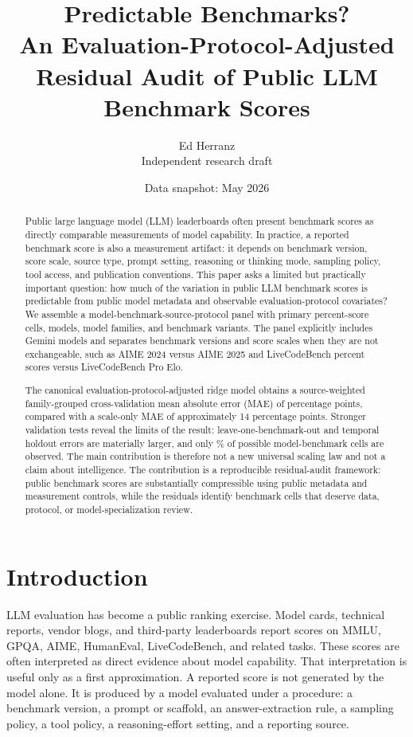 \documentclass[11pt]{article}
\title{Predictable Benchmarks?\\
An Evaluation-Protocol-Adjusted Residual Audit of Public LLM Benchmark Scores}
\author{Ed Herranz\\
\small Independent research draft}
\date{Data snapshot: May 2026}
\begin{document}
\maketitle

\begin{abstract}
Public large language model (LLM) leaderboards often present benchmark scores as directly comparable measurements of model capability. In practice, a reported benchmark score is also a measurement artifact: it depends on benchmark version, score scale, source type, prompt setting, reasoning or thinking mode, sampling policy, tool access, and publication conventions. This paper asks a limited but practically important question: how much of the variation in public LLM benchmark scores is predictable from public model metadata and observable evaluation-protocol covariates? We assemble a model-benchmark-source-protocol panel with \CanonicalCells{} primary percent-score cells, \CanonicalModels{} models, \CanonicalFamilies{} model families, and \CanonicalBenchmarks{} benchmark variants. The panel explicitly includes Gemini models and separates benchmark versions and score scales when they are not exchangeable, such as AIME 2024 versus AIME 2025 and LiveCodeBench percent scores versus LiveCodeBench Pro Elo.

The canonical evaluation-protocol-adjusted ridge model obtains a source-weighted family-grouped cross-validation mean absolute error (MAE) of \CanonicalMAE{} percentage points, compared with a scale-only MAE of approximately 14 percentage points. Stronger validation tests reveal the limits of the result: leave-one-benchmark-out and temporal holdout errors are materially larger, and only \CoveragePct{}\% of possible model-benchmark cells are observed. The main contribution is therefore not a new universal scaling law and not a claim about intelligence. The contribution is a reproducible residual-audit framework: public benchmark scores are substantially compressible using public metadata and measurement controls, while the residuals identify benchmark cells that deserve data, protocol, or model-specialization review.
\end{abstract}

\section{Introduction}
LLM evaluation has become a public ranking exercise. Model cards, technical reports, vendor blogs, and third-party leaderboards report scores on MMLU, GPQA, AIME, HumanEval, LiveCodeBench, and related tasks. These scores are often interpreted as direct evidence about model capability. That interpretation is useful only as a first approximation. A reported score is not generated by the model alone. It is produced by a model evaluated under a procedure: a benchmark version, a prompt or scaffold, an answer-extraction rule, a sampling policy, a tool policy, a reasoning-effort setting, and a reporting source.
\end{document}
